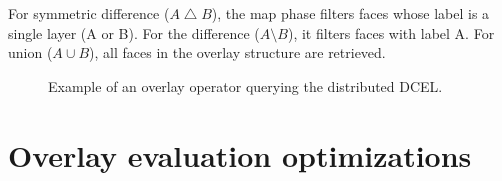 For symmetric difference ($A \bigtriangleup B$), the map phase filters faces whose label is a single layer (A or B).  
For the difference ($A \setminus B$), it filters faces with label A. For union ($A \cup B$), all faces in the overlay structure are retrieved. 

\begin{figure}
    \centering
    \hfill
    \hfill
    \caption{Example of an overlay operator querying the distributed DCEL.} \label{fig:overlay_operator}
\end{figure}

\section{Overlay evaluation optimizations}\label{sec:alternative_methods}
